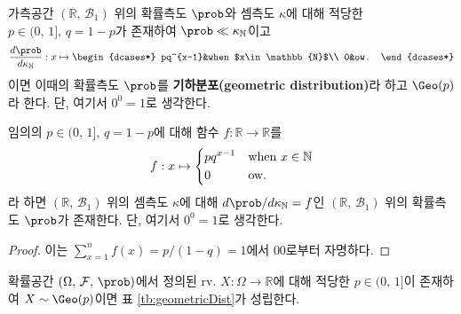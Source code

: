\begin{definition}
    가측공간 $(\mathbb{R},\,\mathcal{B}_1)$ 위의 확률측도 $\prob$와 셈측도 $\kappa$에 대해 적당한 $p\in(0,\,1],\,q=1-p$가 존재하여 $\prob\ll\kappa_{\mathbb{N}}$이고
    \begin{equation*}
        \frac{d\prob}{d\kappa_{\mathbb{N}}}:x\mapsto
        \begin{dcases*}
            pq^{x-1}&when $x\in\mathbb{N}$\\
            0&ow.
        \end{dcases*}
    \end{equation*}
    이면 이때의 확률측도 $\prob$를 \textbf{기하분포(geometric distribution)}라 하고 $\Geo(p)$라 한다. 단, 여기서 $0^0=1$로 생각한다.
\end{definition}

\begin{proposition}
    임의의 $p\in(0,\,1],\,q=1-p$에 대해 함수 $f:\mathbb{R}\to\mathbb{R}$를
    \begin{equation*}
        f:x\mapsto
        \begin{dcases*}
            pq^{x-1}&when $x\in\mathbb{N}$\\
            0&ow.
        \end{dcases*}
    \end{equation*}
    라 하면 $(\mathbb{R},\,\mathcal{B}_1)$ 위의 셈측도 $\kappa$에 대해 $d\prob/d\kappa_{\mathbb{N}}=f$인 $(\mathbb{R},\,\mathcal{B}_1)$ 위의 확률측도 $\prob$가 존재한다. 단, 여기서 $0^0=1$로 생각한다.
\end{proposition}

\begin{proof}
    이는 $\sum_{x=1}^nf(x)=p/(1-q)=1$에서 00로부터 자명하다.
\end{proof}

\begin{theorem}
    확률공간 $(\Omega,\,\mathcal{F},\,\prob)$에서 정의된 rv. $X:\Omega\to\mathbb{R}$에 대해 적당한 $p\in(0,\,1]$이 존재하여 $X\sim\Geo(p)$이면 표 \ref{tb:geometricDist}가 성립한다.
\end{theorem}

